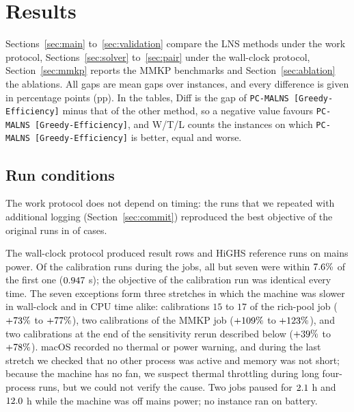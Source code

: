 \documentclass[a4paper,fleqn]{cas-sc}
\newcommand{\pge}{\texttt{PC-MALNS [Greedy-Efficiency]}}
\begin{document}
\section{Results}
\label{sec:results}
Sections~\ref{sec:main} to~\ref{sec:validation} compare the LNS methods under the work protocol, Sections~\ref{sec:solver} to~\ref{sec:pair} under the wall-clock protocol, Section~\ref{sec:mmkp} reports the MMKP benchmarks and Section~\ref{sec:ablation} the ablations. All gaps are mean gaps over instances, and every difference is given in percentage points (pp). In the tables, Diff is the gap of \pge{} minus that of the other method, so a negative value favours \pge, and W/T/L counts the instances on which \pge{} is better, equal and worse.

\subsection{Run conditions}
\label{sec:runconditions}
The work protocol does not depend on timing: the \CFAllRuns{} runs that we repeated with additional logging (Section~\ref{sec:commit}) reproduced the best objective of the original runs in \CFAllIdentical{} of \CFAllRuns{} cases.

The wall-clock protocol produced \RCRows{} result rows and \RCNReference{} HiGHS reference runs on mains power. Of the \RCNCalib{} calibration runs during the jobs, all but seven were within $7.6\%$ of the first one ($0.947$ s); the objective of the calibration run was identical every time. The seven exceptions form three stretches in which the machine was slower in wall-clock and in CPU time alike: calibrations $15$ to $17$ of the rich-pool job ($+73\%$ to $+77\%$), two calibrations of the MMKP job ($+109\%$ to $+123\%$), and two calibrations at the end of the sensitivity rerun described below ($+39\%$ to $+78\%$). macOS recorded no thermal or power warning, and during the last stretch we checked that no other process was active and memory was not short; because the machine has no fan, we suspect thermal throttling during long four-process runs, but we could not verify the cause. Two jobs paused for $2.1$ h and $12.0$ h while the machine was off mains power; no instance ran on battery.
\end{document}
